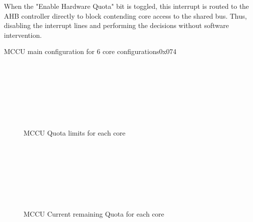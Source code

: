When the "Enable Hardware Quota" bit is toggled, this interrupt is routed to the AHB controller directly to block contending core access to the shared bus. Thus, disabling the interrupt lines and performing the decisions without software intervention.


\begin{register}{}{MCCU main configuration for 6 core configurations}{0x074}
	\label{MCCU_cfg_6c}
	\regnewline
\end{register}
\begin{figure}[H]
	\begin{center}
		 \\
		 \\
		 \\
		 \\
		 \\
		 \\
	\end{center}
	\caption{MCCU Quota limits for each core}\label{fig:MCCU_lim}
\end{figure}
\begin{figure}[H]
	\begin{center}
		 \\
		 \\
		 \\
		 \\
		 \\
		 \\
	\end{center}
	\caption{MCCU Current remaining Quota for each core}\label{fig:MCCU_ava}
\end{figure}
